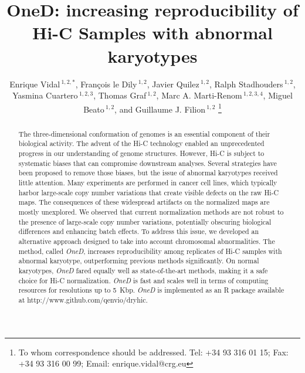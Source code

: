 \documentclass[a4,center,fleqn]{NAR}
\begin{document}
\title{OneD: increasing reproducibility of Hi-C Samples with abnormal
karyotypes}

\author{%
Enrique Vidal\,$^{1,2,*}$,
Fran\c{c}ois le Dily\,$^{1,2}$,
Javier Quilez\,$^{1,2}$,
Ralph Stadhouders\,$^{1,2}$,
Yasmina Cuartero\,$^{1,2,3}$,
Thomas Graf\,$^{1,2}$,
Marc A.  Marti-Renom\,$^{1,2,3,4}$,
Miguel Beato\,$^{1,2}$,
and Guillaume J. Filion\,$^{1,2}$%
\footnote{To whom correspondence should be addressed.
Tel: +34 93 316 01 15; Fax: +34 93 316 00 99; Email: enrique.vidal@crg.eu}}

\address{%
$^{1}$Gene Regulation, Stem Cells and Cancer Program, Centre for
Genomic Regulation (CRG), The Barcelona Institute of Science and
Technology (BIST), Dr. Aiguader 88, 08003, Barcelona, Spain
and
$^{2}$Universitat Pompeu Fabra (UPF), Barcelona, Spain
and
$^{3}$CNAG-CRG, Centre for Genomic Regulation (CRG), Barcelona
Institute of Science and Technology (BIST), Baldiri i Reixac 4, 08028
Barcelona, Spain
and
$^{4}$ICREA, Pg. Llu\'is Companys 23, 08010 Barcelona, Spain}



\maketitle

\begin{abstract}
The three-dimensional conformation of genomes is an
essential component of their biological activity. The advent of the Hi-C
technology enabled an unprecedented progress in our understanding of
genome structures. However, Hi-C is subject to systematic biases that can
compromise downstream analyses. Several strategies have been proposed to
remove those biases, but the issue of abnormal karyotypes received little
attention. Many experiments are performed in cancer cell lines, which
typically harbor large-scale copy number variations that create visible
defects on the raw Hi-C maps. The consequences of these widespread
artifacts on the normalized maps are mostly unexplored.
We observed that current normalization methods are not robust to the
presence of large-scale copy number variations, potentially obscuring
biological differences and enhancing batch effects. To address this issue,
we developed an alternative approach designed to take into account
chromosomal abnormalities. The method, called \textit{OneD}, increases
reproducibility among replicates of Hi-C samples with abnormal karyotype,
outperforming previous methods significantly. On normal karyotypes,
\textit{OneD} fared equally well as state-of-the-art methods, making it a
safe choice for Hi-C normalization.  \textit{OneD} is fast and scales well
in terms of computing resources for resolutions up to 5~Kbp.
\textit{OneD} is implemented as an R package available at
http://www.github.com/qenvio/dryhic.
\end{abstract}
\end{document}
